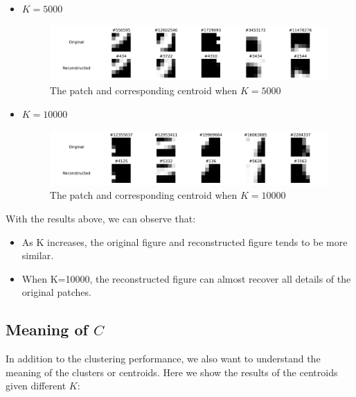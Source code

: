 \documentclass{article}
\begin{document}
\begin{itemize}
            \item $K = 5000$
    \begin{figure}[htbp!]
        \centering
        \includegraphics[width = 0.9 \textwidth]{K-means/Result/Patches/5000-clusters-reconstruction.png}
        \caption{The patch and corresponding centroid when $K = 5000$}
        \label{fig:patches-5000}
    \end{figure}

        \item $K = 10000$
    \begin{figure}[htbp!]
        \centering
        \includegraphics[width = 0.9 \textwidth]{K-means/Result/Patches/10000-clusters-reconstruction.png}
        \caption{The patch and corresponding centroid when $K = 10000$}
        \label{fig:patches-10000}
    \end{figure}
    
\end{itemize}

With the results above, we can observe that:

\begin{itemize}
    \item As K increases, the original figure and reconstructed figure tends to be more similar.
    \item When K=10000, the reconstructed figure can almost recover all details of the original patches.
\end{itemize}


\subsection{Meaning of $C$}

In addition to the clustering performance, we also want to understand the meaning of the clusters or centroids. Here we show the results of the centroids given different $K$:
\end{document}
